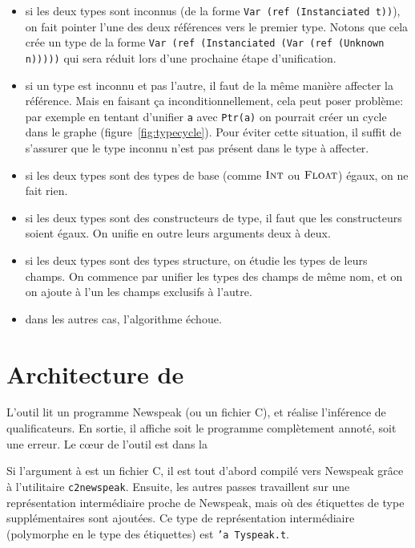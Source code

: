 \begin{itemize}

\item si les deux types sont inconnus (de la forme \texttt{Var (ref
(Instanciated t))}), on fait pointer l'une des deux références vers le premier
type. Notons que cela crée un type de la forme \texttt{Var (ref (Instanciated
(Var (ref (Unknown n)))))} qui sera réduit lors d'une prochaine étape
d'unification.

\item si un type est inconnu et pas l'autre, il faut de la même manière affecter la
référence. Mais en faisant ça inconditionnellement, cela peut poser problème:
par exemple en tentant d'unifier \texttt{a} avec \verb!Ptr(a)! on pourrait
créer un cycle dans le graphe (figure~\ref{fig:typecycle}).
Pour éviter cette situation, il suffit de s'assurer que le type inconnu n'est
pas présent dans le type à affecter.

\item si les deux types sont des types de base (comme $\textsc{Int}$ ou $\textsc{Float}$)
égaux, on ne fait rien.

\item si les deux types sont des constructeurs de type, il faut que les
constructeurs soient égaux. On unifie en outre leurs arguments deux à deux.

\item si les deux types sont des types structure, on étudie les types de leurs
champs. On commence par unifier les types des champs de même nom, et on
on ajoute à l'un les champs exclusifs à l'autre.

\item dans les autres cas, l'algorithme échoue.

\end{itemize}

\section{Architecture de \ptrtype}
\label{sec:ptrtype-archi}

L'outil \ptrtype{} lit un programme Newspeak (ou un fichier C), et réalise
l'inférence de qualificateurs. En sortie, il affiche soit le programme
complètement annoté, soit une erreur. Le cœur de l'outil est dans la

Si l'argument à \ptrtype{} est un fichier C, il est tout d'abord compilé vers
Newspeak grâce à l'utilitaire \texttt{c2newspeak}. Ensuite, les autres passes
travaillent sur une représentation intermédiaire proche de Newspeak, mais où des
étiquettes de type supplémentaires sont ajoutées. Ce type de représentation
intermédiaire (polymorphe en le type des étiquettes) est \texttt{'a Tyspeak.t}.

